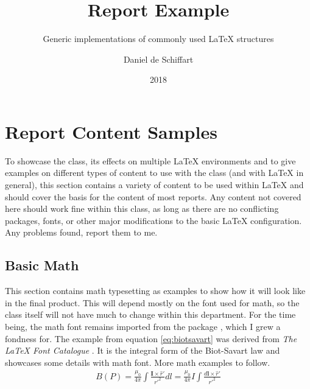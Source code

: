 \documentclass{ist-report}
\begin{document}
\title{Report Example}
\subtitle{Generic implementations of commonly used \LaTeX{} structures}
\author{Daniel de Schiffart}
\date{2018}
\makecover{}

\section{Report Content Samples}

To showcase the class, its effects on multiple \LaTeX{} environments and to give examples on different types of content to use with the class (and with \LaTeX{} in general), this section contains a variety of content to be used within \LaTeX{} and should cover the basis for the content of most reports. Any content not covered here should work fine within this class, as long as there are no conflicting packages, fonts, or other major modifications to the basic \LaTeX{} configuration. Any problems found, report them to me.

\subsection{Basic Math}

This section contains math typesetting as examples to show how it will look like in the final product. This will depend mostly on the font used for math, so the class itself will not have much to change within this department. For the time being, the math font remains imported from the package , which I grew a fondness for. The example from equation \ref{eq:biotsavart} was derived from \textit{The \LaTeX{} Font Catalogue} \cite{fontcatalogue}. It is the integral form of the Biot-Savart law and showcases some details with math font. More math examples to follow.
\begin{gather} \label{eq:biotsavart}
	B(P) = \frac{\mu_0}{4\pi}\int{\frac{\boldsymbol{I} \times \hat{r}'}{r'^2}dl} = \frac{\mu_0}{4\pi} I \int{\frac{d\boldsymbol{l} \times \hat{r}'}{r'^2}}
\end{gather}
\end{document}
